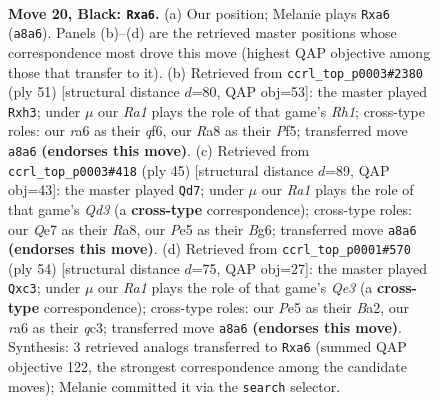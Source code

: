\documentclass[11pt]{article}
\begin{document}
\clearpage

\begin{figure}[p]\centering
\begin{subfigure}{0.46\textwidth}\centering
\resizebox{\linewidth}{!}{%
\newchessgame
\chessboard[
  setfen={r4r2/2p1qp1k/R1p4p/4p1pQ/4P1P1/2PP4/5K2/1NB2R2 b - - 0 20},
  showmover=false,
  pgfstyle=straightmove, color=movearrow, markmove={a8-a6}
]}
\caption{}
\end{subfigure}\hfill
\begin{subfigure}{0.46\textwidth}\centering
\resizebox{\linewidth}{!}{%
\newchessgame
\chessboard[
  setfen={3r3r/pk3p2/1p3Q2/3q1p2/3p4/P6P/1PP2P2/1K1R1R2 b - - 2 26},
  showmover=false,
  pgfstyle=straightmove, color=movearrow, markmove={h8-h3}
]}
\caption{}
\end{subfigure}
\\[4pt]
\begin{subfigure}{0.46\textwidth}\centering
\resizebox{\linewidth}{!}{%
\newchessgame
\chessboard[
  setfen={r4rk1/6p1/2Rqppbp/pP1p4/3Q4/1P2BP2/1P4PP/4R1K1 b - - 1 23},
  showmover=false,
  pgfstyle=straightmove, color=movearrow, markmove={d6-d7}
]}
\caption{}
\end{subfigure}\hfill
\begin{subfigure}{0.46\textwidth}\centering
\resizebox{\linewidth}{!}{%
\newchessgame
\chessboard[
  setfen={3r2k1/5p1p/2p3p1/4b3/p3P1P1/P1q1Q1P1/B1P1RP2/6K1 w - - 3 28},
  showmover=false,
  pgfstyle=straightmove, color=movearrow, markmove={e3-c3}
]}
\caption{}
\end{subfigure}
\caption{\textbf{Move 20, Black: \texttt{Rxa6}.} (a) Our position; Melanie plays \texttt{Rxa6} (\texttt{a8a6}). Panels (b)--(d) are the retrieved master positions whose correspondence most drove this move (highest QAP objective among those that transfer to it). (b) Retrieved from \texttt{ccrl\_top\_p0003\#2380} (ply 51) [structural distance $d$=80, QAP obj=53]: the master played \texttt{Rxh3}; under $\mu$ our \emph{Ra1} plays the role of that game's \emph{Rh1}; cross-type roles: our \emph{r}a6 as their \emph{q}f6, our \emph{R}a8 as their \emph{P}f5; transferred move \texttt{a8a6} \textbf{(endorses this move)}. (c) Retrieved from \texttt{ccrl\_top\_p0003\#418} (ply 45) [structural distance $d$=89, QAP obj=43]: the master played \texttt{Qd7}; under $\mu$ our \emph{Ra1} plays the role of that game's \emph{Qd3} (a \textbf{cross-type} correspondence); cross-type roles: our \emph{Q}e7 as their \emph{R}a8, our \emph{P}e5 as their \emph{B}g6; transferred move \texttt{a8a6} \textbf{(endorses this move)}. (d) Retrieved from \texttt{ccrl\_top\_p0001\#570} (ply 54) [structural distance $d$=75, QAP obj=27]: the master played \texttt{Qxc3}; under $\mu$ our \emph{Ra1} plays the role of that game's \emph{Qe3} (a \textbf{cross-type} correspondence); cross-type roles: our \emph{P}e5 as their \emph{B}a2, our \emph{r}a6 as their \emph{q}c3; transferred move \texttt{a8a6} \textbf{(endorses this move)}. Synthesis: 3 retrieved analogs transferred to \texttt{Rxa6} (summed QAP objective 122, the strongest correspondence among the candidate moves); Melanie committed it via the \texttt{search} selector.}
\label{fig:thought-m39}
\end{figure}
\end{document}
